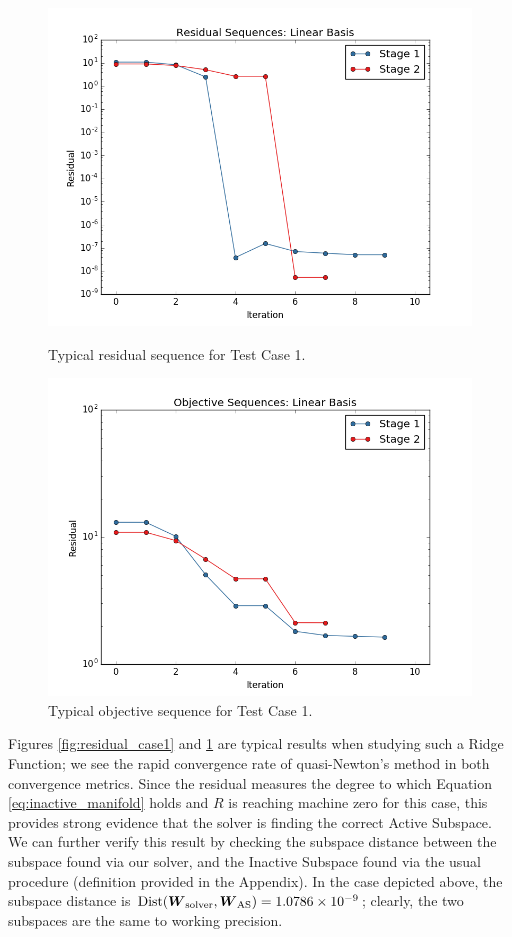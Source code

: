 \documentclass[]{aiaa-tc}%
\begin{document}
\begin{figure}[!ht]
\centering
\begin{minipage}{.50\textwidth}
 \centering
 \includegraphics[width=.8\textwidth]{../images/residual_case1}
 \caption{Typical residual sequence for Test Case 1.}
 \label{fig:residual_case1}
\end{minipage}%
\begin{minipage}{.50\textwidth}
 \centering
 \includegraphics[width=.8\textwidth]{../images/objective_case1}
 \caption{Typical objective sequence for Test Case 1.}
 \label{fig:objective_case1}
\end{minipage}
\end{figure}

Figures \ref{fig:residual_case1} and \ref{fig:objective_case1} are typical results when studying such a Ridge Function; we see the rapid convergence rate of quasi-Newton's method in both convergence metrics. Since the residual measures the degree to which Equation \ref{eq:inactive_manifold} holds and $R$ is reaching machine zero for this case, this provides strong evidence that the solver is finding the correct Active Subspace. We can further verify this result by checking the subspace distance between the subspace found via our solver, and the Inactive Subspace found via the usual procedure (definition provided in the Appendix). In the case depicted above, the subspace distance is $\text{Dist}(\boldsymbol{W}_{\text{solver}},\boldsymbol{W}_{\text{AS}})=1.0786\times10^{-9}$; clearly, the two subspaces are the same to working precision.
\end{document}
